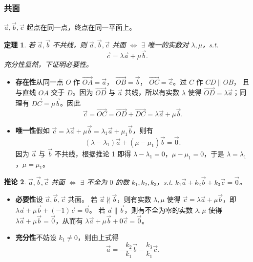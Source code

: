 \documentclass[UTF8,11pt]{ctexart}
\theoremstyle{cnthm}
\newtheorem{thm}{定理}[section]
\newtheorem{cor}[thm]{推论}
\begin{document}
\subsubsection*{共面}

$\vec a,\vec b,\vec c$ 起点在同一点，终点在同一平面上。

\begin{thm}
若 $\vec a,\vec b$ 不共线，则
$\vec a,\vec b,\vec c$ 共面 $\Longleftrightarrow$
$\exists$ 唯一的实数对 $\lambda,\mu$，s.t.
\[
\vec c=\lambda\vec a+\mu\vec b .
\]
充分性显然，下证明必要性。
\end{thm}

\begin{itemize}
\item \textbf{存在性}\quad 从同一点 $O$ 作
$\overrightarrow{OA}=\vec a$，
$\overrightarrow{OB}=\vec b$，
$\overrightarrow{OC}=\vec c$。过 $C$ 作 $CD\parallel OB$，
且与直线 $OA$ 交于 $D$。因为 $\overrightarrow{OD}$ 与
$\vec a$ 共线，所以有实数 $\lambda$ 使得
$\overrightarrow{OD}=\lambda\vec a$；同理有
$\overrightarrow{DC}=\mu\vec b$。因此
\[
\vec c=\overrightarrow{OC}
=\overrightarrow{OD}+\overrightarrow{DC}
=\lambda\vec a+\mu\vec b .
\]

\item \textbf{唯一性}\quad 假如
$\vec c=\lambda\vec a+\mu\vec b
=\lambda_1\vec a+\mu_1\vec b$，则有
\[
(\lambda-\lambda_1)\vec a+(\mu-\mu_1)\vec b=\vec 0 .
\]
因为 $\vec a$ 与 $\vec b$ 不共线，根据推论 1 即得
$\lambda-\lambda_1=0$，$\mu-\mu_1=0$，于是
$\lambda=\lambda_1$，$\mu=\mu_1$。
\end{itemize}

\begin{cor}
$\vec a,\vec b,\vec c$ 共面
$\Longleftrightarrow$ $\exists$ 不全为 $0$ 的数
$k_1,k_2,k_3$，s.t.
$k_1\vec a+k_2\vec b+k_3\vec c=\vec 0$。
\end{cor}

\begin{itemize}
\item \textbf{必要性}\quad 设 $\vec a,\vec b,\vec c$ 共面。
若 $\vec a\nparallel\vec b$，则有实数 $\lambda,\mu$ 使得
$\vec c=\lambda\vec a+\mu\vec b$，即
$\lambda\vec a+\mu\vec b+(-1)\vec c=\vec 0$。
若 $\vec a\parallel\vec b$，则有不全为零的实数 $\lambda,\mu$
使得 $\lambda\vec a+\mu\vec b=\vec 0$，从而有
$\lambda\vec a+\mu\vec b+0\vec c=\vec 0$。
\item \textbf{充分性}\quad 不妨设 $k_1\neq0$，则由上式得
\[
\vec a=-\frac{k_2}{k_1}\vec b-\frac{k_3}{k_1}\vec c .
\]
\end{itemize}
\end{document}
